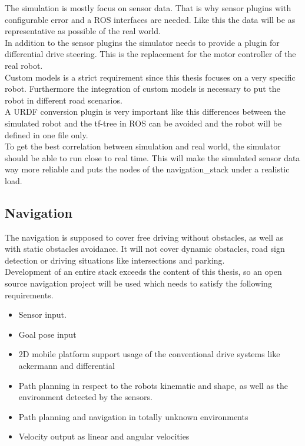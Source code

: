 The simulation is mostly focus on sensor data. That is why sensor plugins with configurable error and a ROS interfaces are needed. Like this the data will be as representative as possible of the real world.\\

In addition to the sensor plugins the simulator needs to provide a plugin for differential drive steering. This is the replacement for the motor controller of the real robot.\\

Custom models is a strict requirement since this thesis focuses on a very specific robot. Furthermore the integration of custom models is necessary to put the robot in different road scenarios.\\

A URDF conversion plugin is very important like this differences between the simulated robot and the tf-tree in ROS can be avoided and the robot will be defined in one file only.\\

To get the best correlation between simulation and real world, the simulator should be able to run close to real time. This will make the simulated sensor data way more reliable and puts the nodes of the navigation\_stack under a realistic load.

\subsection{Navigation}
The navigation is supposed to cover free driving without obstacles, as well as with static obstacles avoidance. It will not cover dynamic obstacles, road sign detection or driving situations like intersections and parking.\\

Development of an entire stack exceeds the content of this thesis, so an open source navigation project will be used which needs to satisfy the following requirements.

\begin{itemize}
	\item Sensor input.
	\item Goal pose input
	\item 2D mobile platform support usage of the conventional drive systems like ackermann and differential
	\item Path planning in respect to the robots kinematic and shape, as well as the environment detected by the sensors.
	\item Path planning and navigation in totally unknown environments
	\item Velocity output as linear and angular velocities
\end{itemize}

